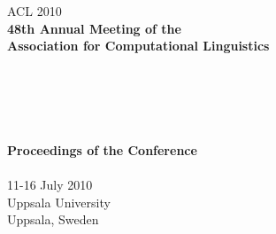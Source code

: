 \documentclass[11pt]{article}
\begin{document}
  \begin{center}
  \LARGE ACL 2010 \\
  \vspace*{55mm}
    {\bf
    \LARGE
    48th Annual Meeting of the \\
    Association for Computational Linguistics\\ \hspace*{1cm}\\ \hspace*{1cm} \\
    \hspace*{1cm} \\ \hspace*{1cm}\\
    \hspace*{1cm}\\
    \vspace{2cm}
    \LARGE
    Proceedings of the Conference\\
    \vspace{2cm}
    \hspace*{1cm}} \\ %
    \vspace{43mm}
    \LARGE
    11-16 July 2010 \\
    Uppsala University\\
    Uppsala, Sweden
  \end{center}
\end{document}
